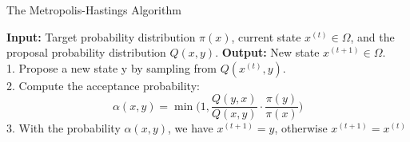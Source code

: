 \documentclass{article}
\begin{document}






\begin{algorithm}
\caption{The Metropolis-Hastings Algorithm}
\label{algo:MH}
    \textbf{Input:} Target probability distribution $\pi(x)$, current state $x^{(t)}\in\Omega$, and the proposal probability distribution $Q(x,y)$.
    \textbf{Output:} New state $x^{(t+1)}\in\Omega$.\\
    1. Propose a new state y by sampling from $Q(x^{(t)},y)$.\\
    2. Compute the acceptance probability:
    \[\alpha(x,y)=\min\Bigg(1,\frac{Q(y,x)}{Q(x,y)}\cdot\frac{\pi(y)}{\pi(x)}\Bigg)\]
    3. With the probability $\alpha(x,y)$, we have $x^{(t+1)}=y$, otherwise $x^{(t+1)}=x^{(t)}$
\end{algorithm}

\end{document}

